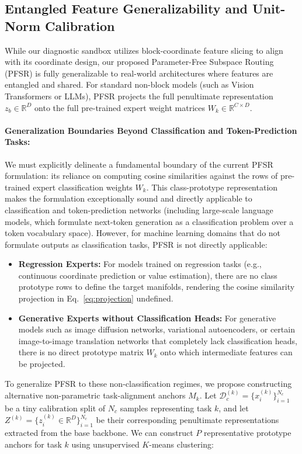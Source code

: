 \subsection{Entangled Feature Generalizability and Unit-Norm Calibration}
While our diagnostic sandbox utilizes block-coordinate feature slicing to align with its coordinate design, our proposed Parameter-Free Subspace Routing (PFSR) is fully generalizable to real-world architectures where features are entangled and shared. For standard non-block models (such as Vision Transformers or LLMs), PFSR projects the full penultimate representation $z_b \in \mathbb{R}^D$ onto the full pre-trained expert weight matrices $W_k \in \mathbb{R}^{C \times D}$.

\paragraph{Generalization Boundaries Beyond Classification and Token-Prediction Tasks:}
\label{sec:non_class_fallback}
We must explicitly delineate a fundamental boundary of the current PFSR formulation: its reliance on computing cosine similarities against the rows of pre-trained expert classification weights $W_k$. This class-prototype representation makes the formulation exceptionally sound and directly applicable to classification and token-prediction networks (including large-scale language models, which formulate next-token generation as a classification problem over a token vocabulary space). 
However, for machine learning domains that do not formulate outputs as classification tasks, PFSR is not directly applicable:
\begin{itemize}
    \item \textbf{Regression Experts:} For models trained on regression tasks (e.g., continuous coordinate prediction or value estimation), there are no class prototype rows to define the target manifolds, rendering the cosine similarity projection in Eq.~\ref{eq:projection} undefined.
    \item \textbf{Generative Experts without Classification Heads:} For generative models such as image diffusion networks, variational autoencoders, or certain image-to-image translation networks that completely lack classification heads, there is no direct prototype matrix $W_k$ onto which intermediate features can be projected.
\end{itemize}
To generalize PFSR to these non-classification regimes, we propose constructing alternative non-parametric task-alignment anchors $M_k$. Let $\mathcal{D}_c^{(k)} = \{x_i^{(k)}\}_{i=1}^{N_c}$ be a tiny calibration split of $N_c$ samples representing task $k$, and let $Z^{(k)} = \{z_i^{(k)} \in \mathbb{R}^D\}_{i=1}^{N_c}$ be their corresponding penultimate representations extracted from the base backbone. We can construct $P$ representative prototype anchors for task $k$ using unsupervised $K$-means clustering:
